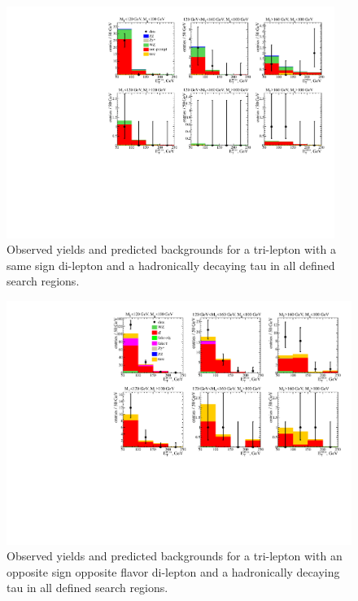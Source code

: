 \begin{figure}[htp]
\begin{center}
\includegraphics[width=0.95\textwidth]{plots/ossf0tau1.pdf}
\caption{Observed yields and predicted backgrounds for a tri-lepton with a same sign di-lepton 
and a hadronically decaying tau in all defined search regions.}
\label{fig:SStau1}
\end{center}
\end{figure}
\begin{figure}[htp]
\begin{center}
\includegraphics[width=1.0\textwidth]{plots/ossf0tau1_C2.pdf}
\caption{Observed yields and predicted backgrounds for a tri-lepton with an opposite sign opposite flavor di-lepton 
and a hadronically decaying tau in all defined search regions.}
\label{fig:OSOFtau1}
\end{center}
\end{figure}

